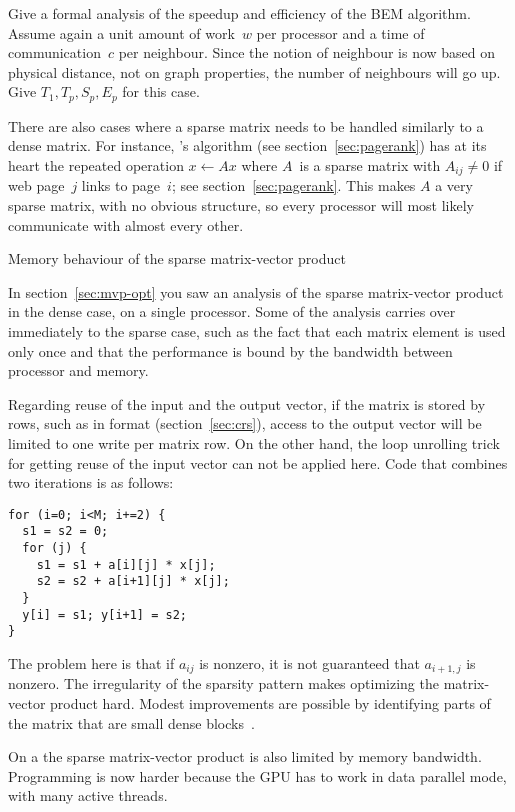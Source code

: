 \begin{exercise}
  Give a formal analysis of the speedup and efficiency of the \ac{BEM}
  algorithm. Assume again a unit amount of work~$w$ per processor and
  a time of communication~$c$ per neighbour. Since the notion of
  neighbour is now based on physical distance, not on graph
  properties, the number of neighbours will go up. Give
  $T_1,T_p,S_p,E_p$ for this case.
\end{exercise}

There are also cases where a sparse matrix needs to be handled
similarly to a dense matrix. For instance, 's
 algorithm (see section~\ref{sec:pagerank}) has at its
heart the repeated operation $x\leftarrow Ax$ where $A$~is a sparse
matrix with $A_{ij}\not=0$ if web page~$j$ links to page~$i$; see
section~\ref{sec:pagerank}. This makes $A$ a very sparse matrix, with
no obvious structure, so every processor will most likely communicate
with almost every other.


 {Memory behaviour of the sparse matrix-vector product}

In section~\ref{sec:mvp-opt} you saw an analysis of the sparse
matrix-vector product in the dense case, on a single processor. Some
of the analysis carries over immediately to the sparse case, such as
the fact that each matrix element is used only once and that the
performance is bound by the bandwidth between processor and memory.

Regarding reuse of the input and the output vector, if the matrix is
stored by rows, such as in  format (section~\ref{sec:crs}),
access to the output vector will be limited to one write per matrix
row.
On the other hand, the loop unrolling
trick for getting reuse of the input vector can not be applied
here. Code that combines two iterations is as follows:
\begin{verbatim}
for (i=0; i<M; i+=2) {
  s1 = s2 = 0;
  for (j) {
    s1 = s1 + a[i][j] * x[j];
    s2 = s2 + a[i+1][j] * x[j];
  }
  y[i] = s1; y[i+1] = s2;
}
\end{verbatim}
The problem here is that if $a_{ij}$ is nonzero, it is not guaranteed
that $a_{i+1,j}$ is nonzero. The irregularity of the sparsity pattern
makes optimizing the matrix-vector product hard. Modest improvements
are possible by identifying parts of the matrix that are small dense
blocks~\cite{ButtEijkLang:spmvp,DemEtAl:ieeeproc2004,oski}.

On a  the sparse matrix-vector product is also limited by
memory bandwidth. Programming is now harder because the \ac{GPU} has
to work in data parallel mode, with many active threads. 

